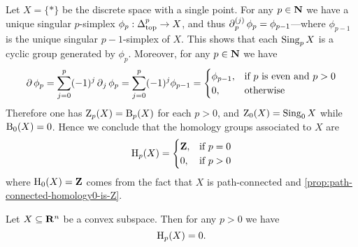 \begin{example}
    \label{exp:homology-of-point-space}
    Let \(X = \{*\}\) be the discrete space with a single point. For any \(p \in
    \mathbf{N}\) we have a unique singular \(p\)-simplex \(\phi_p: \Delta_{\text{top}}^p \to X\), and
    thus \(\operatorname{\partial}_p^{(j)} \phi_p = \phi_{p-1}\)---where \(\phi_{p-1}\) is the unique
    singular \(p-1\)-simplex of \(X\). This shows that each \(\operatorname{Sing}_p X\) is a
    cyclic group generated by \(\phi_p\). Moreover, for any \(p \in \mathbf{N}\) we have
    \[
        \operatorname{\partial} \phi_p = \sum_{j=0}^p (-1)^j \operatorname{\partial}_j \phi_p
        = \sum_{j=0}^p (-1)^j \phi_{p-1}
        =
        \begin{cases}
            \phi_{p-1}, & \text{if } p \text{ is even and } p > 0 \\
            0,          & \text{otherwise}
        \end{cases}
    \]
    Therefore one has \(\operatorname{Z}_p(X) = \operatorname{B}_p(X)\) for each \(p > 0\), and
    \(\operatorname{Z}_0(X) = \operatorname{Sing}_0 X\) while \(\operatorname{B}_0(X) = 0\). Hence we conclude that the
    homology groups associated to \(X\) are
    \[
        \operatorname{H}_p(X) =
        \begin{cases}
            \mathbf{Z}, & \text{if } p = 0 \\
            0,  & \text{if } p > 0
        \end{cases}
    \]
    where \(\operatorname{H}_0(X) = \mathbf{Z}\) comes from the fact that \(X\) is path-connected and
    \cref{prop:path-connected-homology0-is-Z}.
\end{example}

\begin{theorem}
    \label{thm:convex-space-Rn-zero-homology}
    Let \(X \subseteq \mathbf{R}^n\) be a convex subspace. Then for any \(p > 0\) we have
    \[
        \operatorname{H}_p(X) = 0.
    \]
\end{theorem}

